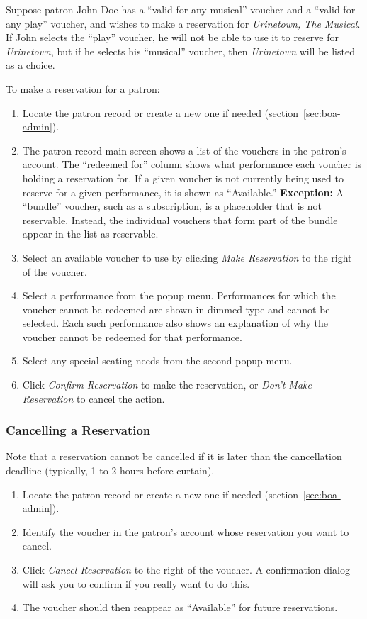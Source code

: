 Suppose patron John Doe has a ``valid for any musical'' voucher and a
``valid for any play'' voucher, and wishes to make a reservation for
\emph{Urinetown, The Musical}.  If John selects the ``play''
voucher, he will not be able to use it to reserve for \emph{Urinetown},
but if he selects his ``musical'' voucher, then \emph{Urinetown} will be
listed as a choice.

To make a reservation for a patron:

\begin{enumerate}
\item Locate the patron record or create a new one if needed
  (section~\ref{sec:boa-admin}). 
\item The patron record main screen shows a list of the vouchers in the
  patron's account.  The ``redeemed for'' column shows what performance
  each voucher is holding a reservation for.  If a given voucher is not
  currently being used to reserve for a given performance, it is shown
  as ``Available.''  \textbf{Exception:} A ``bundle'' voucher, such as a
  subscription, is a placeholder that is not reservable.  Instead, the
  individual vouchers that form part of the bundle appear in the list as
  reservable. 
\item Select an available voucher to use  by  clicking \emph{Make
    Reservation} to the right of the voucher.
\item Select a performance from the popup menu. Performances for which
  the voucher cannot be redeemed are shown in dimmed type and cannot be
  selected.  Each such performance also shows an explanation of why the
  voucher cannot be redeemed for that performance.
\item Select any special seating needs from the second popup menu.
\item Click \emph{Confirm Reservation} to make the reservation, or
  \emph{Don't Make Reservation} to cancel the action.
\end{enumerate}

\subsubsection{Cancelling a Reservation}
\label{sec:cancelling}

Note that a reservation cannot be cancelled if it is later than the
cancellation deadline (typically, 1 to 2 hours before curtain).


\begin{enumerate}
\item Locate the patron record or create a new one if needed
  (section~\ref{sec:boa-admin}). 
\item Identify the voucher in the patron's account whose reservation you
  want to cancel.
\item Click \emph{Cancel Reservation} to the right of the voucher.  A
  confirmation dialog will ask you to confirm if you really want to do
  this.
\item The voucher should then reappear as ``Available'' for future
  reservations. 
\end{enumerate}

